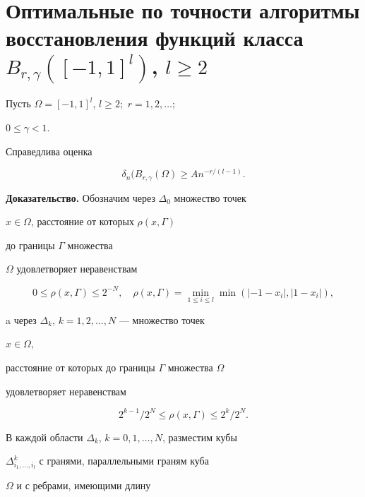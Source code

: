 \section{Оптимальные по точности алгоритмы\protect\\


восстановления функций класса $B_{r,\gamma}([-1,1]^l)$, $l\ge 2$}





\begin{thms} Пусть $\Omega=[-1,1]^l$, $l\ge 2;$ $r=1,2,\dotsc;$


$0 \le \gamma <1$.


Справедлива оценка


\begin {equation}


\delta_n(B_{r,\gamma}(\Omega) \ge An^{-r/(l-1)}.


\end{equation}


\end{thms}





{\bf Доказательство.} Обозначим через $\Delta_0$ множество точек


$x\in\Omega$, расстояние от которых $\rho (x, \Gamma)$


до границы $\Gamma$ множества


$\Omega$ удовлетворяет неравенствам


$$


0\le \rho (x, \Gamma)\le 2^{-N},\quad


\rho (x, \Gamma)=\min_{1\le i\le l} \min(|-1-x_i|,| 1-x_i|),


$$


a через $\Delta_k$, $k=1,2,\dotsc,N$ --- множество точек


$x\in\Omega,$


расстояние от которых до границы $\Gamma $ множества $\Omega $


удовлетворяет неравенствам


$$


2^{k-1}/2^N \le \rho (x, \Gamma)\le 2^k/2^N.


$$


В каждой области $\Delta_k$, $k=0,1,\dotsc,N$, разместим кубы


$\Delta^k_{i_1,\dotsc,i_l}$ с гранями, параллельными граням куба


$\Omega$ и с ребрами, имеющими длину


